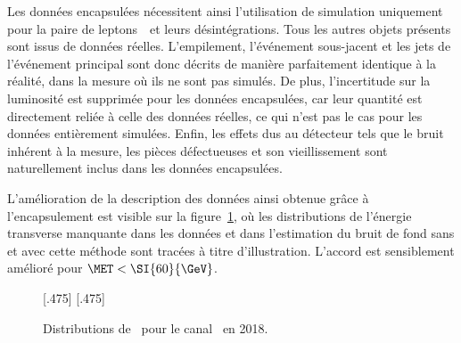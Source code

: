 \par
Les données encapsulées nécessitent ainsi l'utilisation de simulation uniquement pour la paire de leptons~\tau\ et leurs désintégrations.
Tous les autres objets présents sont issus de données réelles.
L'empilement, l'événement sous-jacent et les jets de l'événement principal sont donc décrits de manière parfaitement identique à la réalité, dans la mesure où ils ne sont pas simulés.
De plus, l'incertitude sur la luminosité est supprimée pour les données encapsulées, car leur quantité est directement reliée à celle des données réelles, ce qui n'est pas le cas pour les données entièrement simulées.
Enfin, les effets dus au détecteur tels que le bruit inhérent à la mesure, les pièces défectueuses et son vieillissement sont naturellement inclus dans les données encapsulées.
\par
L'amélioration de la description des données ainsi obtenue grâce à l'encapsulement est visible sur la figure~\ref{fig-embedding_2018mt_puppimet_illustration}, où les distributions de l'énergie transverse manquante dans les données et dans l'estimation du bruit de fond sans et avec cette méthode sont tracées à titre d'illustration.
L'accord est sensiblement amélioré pour $\MET < \SI{60}{\GeV}$.
\begin{figure}[h]
\centering

[.475\textwidth]
{}
\hfill
{}[.475\textwidth]
{}

\caption{Distributions de \MET\ pour le canal \mu\tauh\ en 2018.}
\label{fig-embedding_2018mt_puppimet_illustration}
\end{figure}
